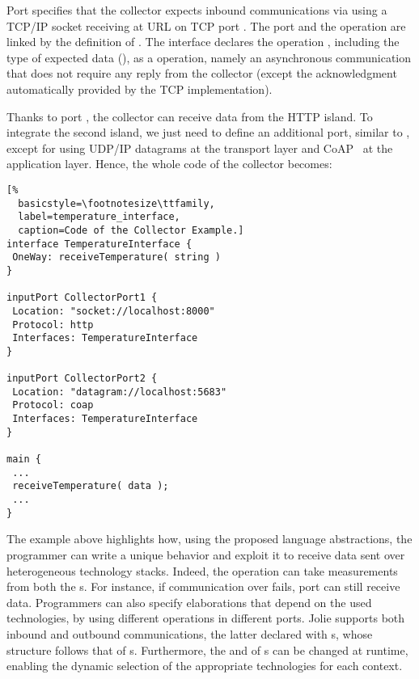 Port  specifies that the collector expects inbound
communications via   using a TCP/IP socket receiving
at URL  on TCP port . The port and the operation
are linked by the definition of 
. The interface declares the operation
, including the type of expected data
(), as a  operation, namely an asynchronous
communication that does not require any reply from the collector (except the
acknowledgment automatically provided by the TCP implementation).

Thanks to port , the collector can receive data from the
HTTP island. To integrate the second island, we just need to define an
additional port, similar to , except for using UDP/IP
datagrams at the transport layer and CoAP~\cite{doi:10.17487/RFC7252,coap} at the application layer. Hence, the
whole code of the collector becomes:
%
\begin{lstlisting}[%
  basicstyle=\footnotesize\ttfamily,
  label=temperature_interface, 
  caption=Code of the Collector Example.]
interface TemperatureInterface {
 OneWay: receiveTemperature( string )
}

inputPort CollectorPort1 {
 Location: "socket://localhost:8000"
 Protocol: http
 Interfaces: TemperatureInterface
}

inputPort CollectorPort2 {
 Location: "datagram://localhost:5683"
 Protocol: coap
 Interfaces: TemperatureInterface
}

main {
 ...
 receiveTemperature( data );
 ...
}
\end{lstlisting}
%
The example above highlights how, using the proposed language abstractions, the
programmer can write a unique behavior and exploit it to receive data sent over
heterogeneous technology stacks. Indeed, the 
operation can take measurements from both the s.
%
For instance, if communication over  fails, port
 can still receive data.
%
Programmers can also specify elaborations that depend on the used technologies, 
by using different operations in different ports.
Jolie supports both inbound and outbound
communications, the latter declared with s, whose structure
follows that of s. Furthermore, the  and
 of s can be changed at runtime, enabling the
dynamic selection of the appropriate technologies for each context.

